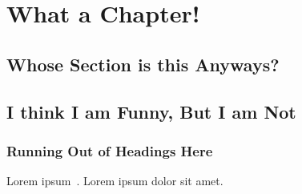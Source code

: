 \chapter{What a Chapter!}

\lipsum[2-10]

\section{Whose Section is this Anyways?}

\lipsum
\section{I think I am Funny, But I am Not}

\lipsum[1-3]
\subsection{Running Out of Headings Here}

Lorem ipsum~\cite{bib3}.  Lorem ipsum dolor sit amet. 
\lipsum[1]

\lipsum

